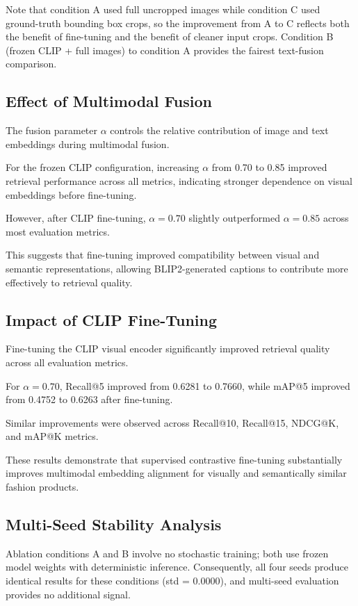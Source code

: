 \documentclass[11pt,a4paper]{article}
\begin{document}
Note that condition A used full uncropped images while condition C used ground-truth bounding box crops, so the improvement from A to C reflects both the benefit of fine-tuning and the benefit of cleaner input crops. Condition B (frozen CLIP + full images) to condition A provides the fairest text-fusion comparison.

\subsection{Effect of Multimodal Fusion}

The fusion parameter $\alpha$ controls the relative contribution of image and text embeddings during multimodal fusion.

For the frozen CLIP configuration, increasing $\alpha$ from 0.70 to 0.85 improved retrieval performance across all metrics, indicating stronger dependence on visual embeddings before fine-tuning.

However, after CLIP fine-tuning, $\alpha = 0.70$ slightly outperformed $\alpha = 0.85$ across most evaluation metrics.

This suggests that fine-tuning improved compatibility between visual and semantic representations, allowing BLIP2-generated captions to contribute more effectively to retrieval quality.

\subsection{Impact of CLIP Fine-Tuning}
\label{sec:finetune_impact}

Fine-tuning the CLIP visual encoder significantly improved retrieval quality across all evaluation metrics.

For $\alpha = 0.70$, Recall@5 improved from 0.6281 to 0.7660, while mAP@5 improved from 0.4752 to 0.6263 after fine-tuning.

Similar improvements were observed across Recall@10, Recall@15, NDCG@K, and mAP@K metrics.

These results demonstrate that supervised contrastive fine-tuning substantially improves multimodal embedding alignment for visually and semantically similar fashion products.

\subsection{Multi-Seed Stability Analysis}

Ablation conditions A and B involve no stochastic training; both use frozen model weights with deterministic inference. Consequently, all four seeds produce identical results for these conditions (std = 0.0000), and multi-seed evaluation provides no additional signal.
\end{document}
